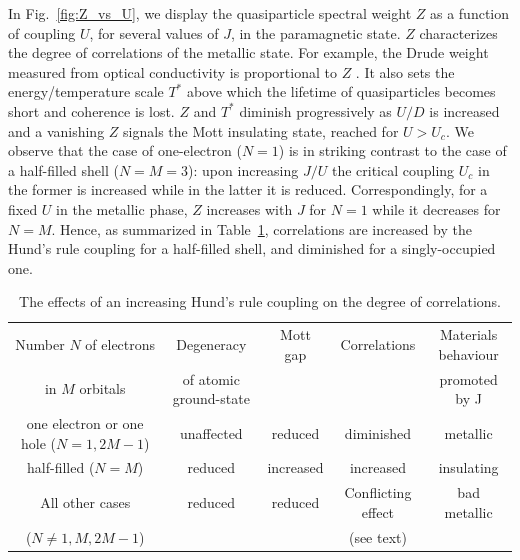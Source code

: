 \documentclass[aps,prl,amsmath, amssymb, english, aps, prl, onecolumn,
  reprint,floatfix, superscriptaddress]{revtex4-1}
\begin{document}
In Fig.~\ref{fig:Z_vs_U}, we display the quasiparticle spectral weight
$Z$ as a function of coupling $U$, for several values of $J$, in the
paramagnetic state.  $Z$ characterizes the degree of correlations of
the metallic state. For example, the Drude weight measured from
optical conductivity is proportional to $Z$
\cite{georges96}. It also sets the energy/temperature scale $T^*$
above which the lifetime of quasiparticles becomes short and coherence
is lost.  $Z$ and $T^*$ diminish progressively as $U/D$ is increased
and a vanishing $Z$ signals the Mott insulating state, reached for
$U>U_c$.
% 
We observe that the case of one-electron ($N=1$) is in striking
contrast to the case of a half-filled shell ($N=M=3$): upon increasing
$J/U$ the critical coupling $U_c$ in the former is
increased\cite{demedici_MottHund} while in the latter it is
reduced\cite{bunemann_gutzwiller_prb_1998,han_multiorbital}.
Correspondingly, for a fixed $U$ in the metallic phase, $Z$ increases
with $J$ for $N=1$ while it decreases for $N=M$.  Hence, as summarized
in Table~\ref{table:influence_on_coherence}, correlations are
increased by the Hund's rule coupling for a half-filled shell, and
diminished for a singly-occupied one.

\begin{table}
\begin{ruledtabular}
\begin{tabular}{c c c c c}
Number $N$ of electrons & Degeneracy & Mott gap  & Correlations  
& Materials behaviour \\ 
in $M$ orbitals & of atomic ground-state & &  
& promoted by J\\
\hline\hline
one electron or one hole ($N=1,2M-1$) & unaffected & reduced & diminished & metallic\\ \hline
half-filled ($N=M$) & reduced & increased & increased & insulating\\ \hline
All other cases  & reduced & reduced  &  Conflicting effect & bad metallic\\
($N\neq 1, M, 2M-1$) & &  & (see text) \\
\end{tabular}
\end{ruledtabular}
\caption{The effects of an increasing Hund's rule coupling on the degree of correlations. \label{table:influence_on_coherence}} 
\end{table}
\end{document}
